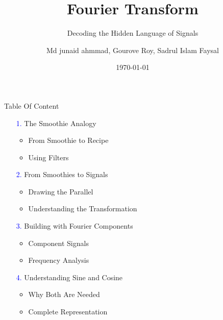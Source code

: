 \documentclass[aspectratio=1610]{beamer}
\title[Fourier Transform]{Fourier Transform}
\subtitle{Decoding the Hidden Language of Signals}
\author{Md junaid ahmmad, Gourove Roy, Sadrul Islam Faysal}
\date{\today}
\begin{document}
\begin{frame}
    \titlepage
\end{frame}

\begin{frame}{Table Of Content}
    \begin{center}
        \vspace{0.5cm}
        \begin{itemize}[]
            \item[\textcolor{blue}{1.}] The Smoothie Analogy
                \begin{itemize}
                    \item From Smoothie to Recipe
                    \item Using Filters
                \end{itemize}
            \vspace{0.3cm}
            
            \item[\textcolor{blue}{2.}] From Smoothies to Signals
                \begin{itemize}
                    \item Drawing the Parallel
                    \item Understanding the Transformation
                \end{itemize}
            \vspace{0.3cm}
            
            \item[\textcolor{blue}{3.}] Building with Fourier Components
                \begin{itemize}
                    \item Component Signals
                    \item Frequency Analysis
                \end{itemize}
            \vspace{0.3cm}
            
            \item[\textcolor{blue}{4.}] Understanding Sine and Cosine
                \begin{itemize}
                    \item Why Both Are Needed
                    \item Complete Representation
                \end{itemize}
        \end{itemize}
    \end{center}
\end{frame}
\end{document}
